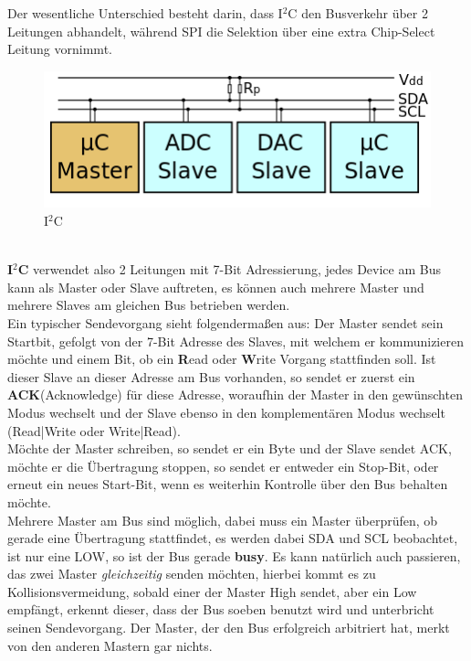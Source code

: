 \documentclass[12pt,a4paper,ngerman]{article}
\begin{document}
Der wesentliche Unterschied besteht darin, dass I$^2$C den Busverkehr über 2 Leitungen abhandelt, während SPI die Selektion über eine extra Chip-Select Leitung vornimmt. \\
\begin{figure}[h]
\begin{center}
\includegraphics[scale=0.5]{figures/i2c.png} 
\caption{I$^2$C}
\end{center}
\vspace{-20pt}
\end{figure}\\
\textbf{I$^2$C} verwendet also 2 Leitungen mit 7-Bit Adressierung, jedes Device am Bus kann als Master oder Slave auftreten, es können auch mehrere Master und mehrere Slaves am gleichen Bus betrieben werden. \\
Ein typischer Sendevorgang sieht folgendermaßen aus: Der Master sendet sein Startbit, gefolgt von der 7-Bit Adresse des Slaves, mit welchem er kommunizieren möchte und einem Bit, ob ein \textbf{R}ead oder \textbf{W}rite Vorgang stattfinden soll. Ist dieser Slave an dieser Adresse am Bus vorhanden, so sendet er zuerst ein \textbf{ACK}(Acknowledge) für diese Adresse, woraufhin der Master in den gewünschten Modus wechselt und der Slave ebenso in den komplementären Modus wechselt (Read|Write oder Write|Read). \\
Möchte der Master schreiben, so sendet er ein Byte und der Slave sendet ACK, möchte er die Übertragung stoppen, so sendet er entweder ein Stop-Bit, oder erneut ein neues Start-Bit, wenn es weiterhin Kontrolle über den Bus behalten möchte. \\
Mehrere Master am Bus sind möglich, dabei muss ein Master überprüfen, ob gerade eine Übertragung stattfindet, es werden dabei SDA und SCL beobachtet, ist nur eine LOW, so ist der Bus gerade \textbf{busy}. Es kann natürlich auch passieren, das zwei Master \textit{gleichzeitig} senden möchten, hierbei kommt es zu Kollisionsvermeidung, sobald einer der Master High sendet, aber ein Low empfängt, erkennt dieser, dass der Bus soeben benutzt wird und unterbricht seinen Sendevorgang. Der Master, der den Bus erfolgreich arbitriert hat, merkt von den anderen Mastern gar nichts. \\
\end{document}
